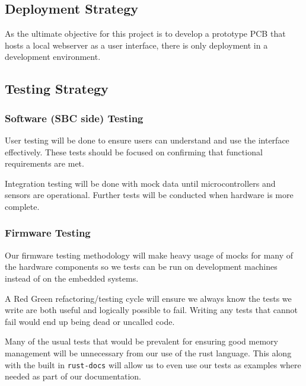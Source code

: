 \hypertarget{deployment-strategy}{%
\subsection{Deployment Strategy}\label{deployment-strategy}}

As the ultimate objective for this project is to develop a prototype PCB
that hosts a local webserver as a user interface, there is only
deployment in a development environment.

\hypertarget{testing-strategy}{%
\subsection{Testing Strategy}\label{testing-strategy}}

\hypertarget{software-sbc-side-testing}{%
\subsubsection{Software (SBC side)
Testing}\label{software-sbc-side-testing}}

User testing will be done to ensure users can understand and use the
interface effectively. These tests should be focused on confirming that
functional requirements are met.

Integration testing will be done with mock data until microcontrollers
and sensors are operational. Further tests will be conducted when
hardware is more complete.

\hypertarget{firmware-testing}{%
\subsubsection{Firmware Testing}\label{firmware-testing}}

Our firmware testing methodology will make heavy usage of mocks for many
of the hardware components so we tests can be run on development
machines instead of on the embedded systems.

A Red Green refactoring/testing cycle will ensure we always know the
tests we write are both useful and logically possible to fail. Writing
any tests that cannot fail would end up being dead or uncalled code.

Many of the usual tests that would be prevalent for ensuring good memory
management will be unnecessary from our use of the rust language. This
along with the built in \texttt{rust-docs} will allow us to even use our
tests as examples where needed as part of our documentation.

